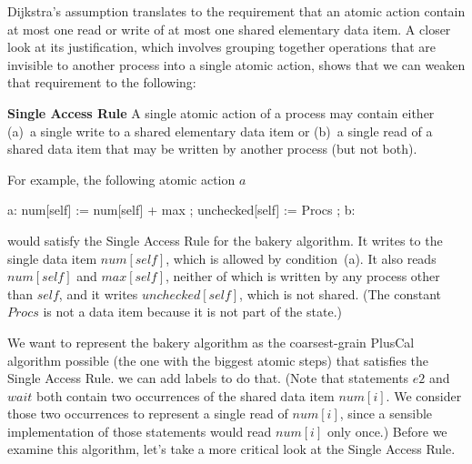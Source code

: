 \documentclass[fleqn,leqno]{article}
\begin{document}
Dijkstra's assumption translates to the requirement that an atomic
action contain at most one read or write of at most one
shared elementary data item.  A closer look at its justification,
which involves grouping together operations that are invisible to
another process into a single atomic action, shows that we can weaken
that requirement to the following:
\begin{display}
\textbf{Single Access Rule } 
A single atomic action of a process may
contain either (a)~a single write to a shared elementary data item or
(b)~a single read of a shared data item that may be written by another
process (but not both).
\end{display}
For example, the following atomic action $a$
\begin{display}
\begin{nopcal}
a: num[self] := num[self] + max ;
   unchecked[self] := Procs ;
b: 
\end{nopcal}
\begin{tlatex}
%
%
\end{tlatex}
\end{display}
would satisfy the Single Access Rule for the bakery algorithm.  
It writes to the single data item $num[self]$, which is
allowed by condition~(a).  It also reads $num[self]$ and $max[self]$,
neither of which is written by any process other than $self$, and it
writes $unchecked[self]$, which is not shared.  (The constant $Procs$ is
not a data item because it is not part of the state.)

We want to represent the bakery algorithm as the coarsest-grain
PlusCal algorithm possible (the one with the biggest atomic steps)
that satisfies the Single Access Rule.   we can add labels to do that.  (Note that statements $e2$ and
$wait$ both contain two occurrences of the shared data item $num[i]$.
We consider those two occurrences to represent a single read of
$num[i]$, since a sensible implementation of those statements would
read $num[i]$ only once.)  Before we examine this algorithm, let's
take a more critical look at the Single Access Rule.

\medskip
\end{document}
